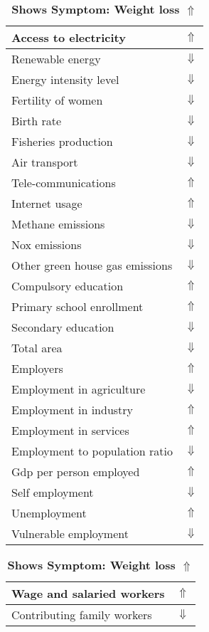 \documentclass[12pt,notitlepage,oneside]{report}
\begin{document}
\begin{table}[!htb]
\caption{\textbf{Shows Symptom: Weight loss $\Uparrow$}}
\centering
\label{Correlated Socio-economic Factors0}
\begin{tabular}{|l|l|}
\hline
Access to electricity & $\Uparrow$\\ \hline
Renewable energy & $\Downarrow$\\ \hline
Energy intensity level & $\Downarrow$\\ \hline
Fertility of women & $\Downarrow$\\ \hline
Birth rate & $\Downarrow$\\ \hline
Fisheries production & $\Downarrow$\\ \hline
Air transport  & $\Downarrow$\\ \hline
Tele-communications & $\Uparrow$\\ \hline
Internet usage & $\Uparrow$\\ \hline
Methane emissions & $\Downarrow$\\ \hline
Nox emissions & $\Downarrow$\\ \hline
Other green house gas emissions & $\Downarrow$\\ \hline
Compulsory education & $\Uparrow$\\ \hline
Primary school enrollment & $\Uparrow$\\ \hline
Secondary education & $\Downarrow$\\ \hline
Total area & $\Downarrow$\\ \hline
Employers & $\Uparrow$\\ \hline
Employment in agriculture & $\Downarrow$\\ \hline
Employment in industry & $\Uparrow$\\ \hline
Employment in services & $\Uparrow$\\ \hline
Employment to population ratio & $\Downarrow$\\ \hline
Gdp per person employed & $\Uparrow$\\ \hline
Self employment & $\Downarrow$\\ \hline
Unemployment & $\Uparrow$\\ \hline
Vulnerable employment & $\Downarrow$\\ \hline
\end{tabular}
\begin{tabular}{|l|l|}
\hline
Wage and salaried workers & $\Uparrow$\\ \hline
Contributing family workers & $\Downarrow$\\ \hline

\end{tabular}
\end{table}
\end{document}
